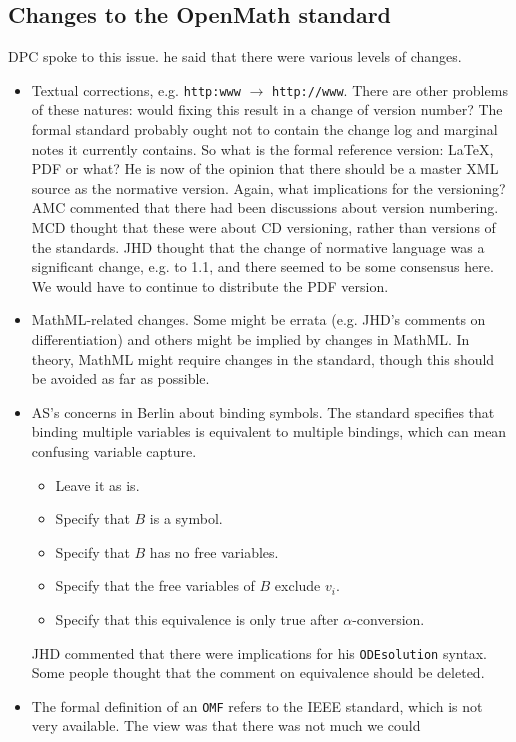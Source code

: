 \documentclass[11pt, a4paper]{article}
\begin{document}
\subsection{Changes to the OpenMath standard}
DPC spoke to this issue. he said that there were various levels of changes.
\begin{itemize}
\item Textual corrections, e.g. \verb=http:www= $\rightarrow$
\verb=http://www=. There are other problems of these natures: would fixing
this result in a change of version number? The formal standard probably
ought not to contain the change log and marginal notes it currently
contains. So what is the formal reference version: \LaTeX{}, PDF or what?
He is now of the opinion that there should be a master XML source as the
normative version. Again, what implications for the versioning? AMC
commented that there had been discussions about version numbering. MCD
thought that these were about CD versioning, rather
than versions of the standards. JHD thought that the change of normative
language was a significant change, e.g. to 1.1, and there seemed to be some
consensus here. We would have to continue to distribute the PDF version.
\item MathML-related changes. Some might be errata (e.g. JHD's comments on
differentiation) and others might be implied by changes in MathML. In
theory, MathML might require changes in the standard, though this should be
avoided as far as possible.
\item AS's concerns in Berlin about binding symbols. The standard specifies
that binding multiple variables is equivalent to multiple bindings, which
can mean confusing variable capture.
\begin{itemize}
\item Leave it as is.
\item Specify that $B$ is a symbol.
\item Specify that $B$ has no free variables.
\item Specify that the free variables of $B$ exclude $v_i$.
\item Specify that this equivalence is only true after $\alpha$-conversion.
\end{itemize}
JHD commented that there were implications for his \verb+ODEsolution+
syntax. Some people thought that the comment on equivalence should be
deleted.
\item The formal definition of an \verb+OMF+ refers to the IEEE standard,
which is not very available. The view was that there was not much we could

\end{itemize}
\end{document}
